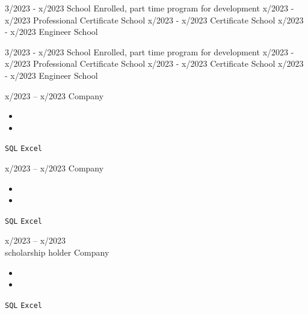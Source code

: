 \documentclass[9pt]{developercv} %
\begin{document}
\vspace{-10 pt}
\begin{entrylist}
    \entry
		{3/2023 - x/2023}
		{\lipsum[1][1] }
		{School}
		{Enrolled, part time program for development}
    \entry
		{x/2023 - x/2023}
		{Professional Certificate}
		{School}
		{\lipsum[1][1]}
	\entry
		{x/2023 - x/2023}
		{Certificate}
		{School}
		{\lipsum[1][2]}
	\entry
		{x/2023 - x/2023}
		{Engineer}
		{School}
		{\lipsum[1][2]}
\end{entrylist}



\vspace{-10 pt}
\begin{entrylist}
    \entry
		{3/2023 - x/2023}
		{\lipsum[1][1] }
		{School}
		{Enrolled, part time program for development}
    \entry
		{x/2023 - x/2023}
		{Professional Certificate}
		{School}
		{\lipsum[1][1]}
	\entry
		{x/2023 - x/2023}
		{Certificate}
		{School}
		{\lipsum[1][2]}
	\entry
		{x/2023 - x/2023}
		{Engineer}
		{School}
		{\lipsum[1][2]}
\end{entrylist}



\vspace{-10 pt}
\begin{entrylist}
	\entry
        {x/2023 -- x/2023}
		{\lipsum[1][1]}
		{Company}
		{\vspace{-10pt}
        \begin{itemize}[noitemsep,topsep=0pt,parsep=0pt,partopsep=0pt, leftmargin=-1pt]
            \item \lipsum[1][1-2]
            \item \lipsum[1][3-4]
        \end{itemize} 
        \texttt{SQL} \slashsep \texttt{Excel}}
	\entry
		{x/2023 -- x/2023}
		{\lipsum[1][1]}
		{Company}
		{\vspace{-10pt}
        \begin{itemize}[noitemsep,topsep=0pt,parsep=0pt,partopsep=0pt, leftmargin=-1pt]
            \item \lipsum[1][1-2]
            \item \lipsum[1][3-4]
        \end{itemize} 
        \texttt{SQL} \slashsep \texttt{Excel}}
	\entry
		{x/2023 -- x/2023 \\\footnotesize{scholarship holder}}
		{\lipsum[1][1]}
		{Company}
		{\vspace{-10pt}
        \begin{itemize}[noitemsep,topsep=0pt,parsep=0pt,partopsep=0pt, leftmargin=-1pt]
            \item \lipsum[1][1-2]
            \item \lipsum[1][3-4]
        \end{itemize} 
        \texttt{SQL} \slashsep \texttt{Excel}}
\end{entrylist}
\end{document}
